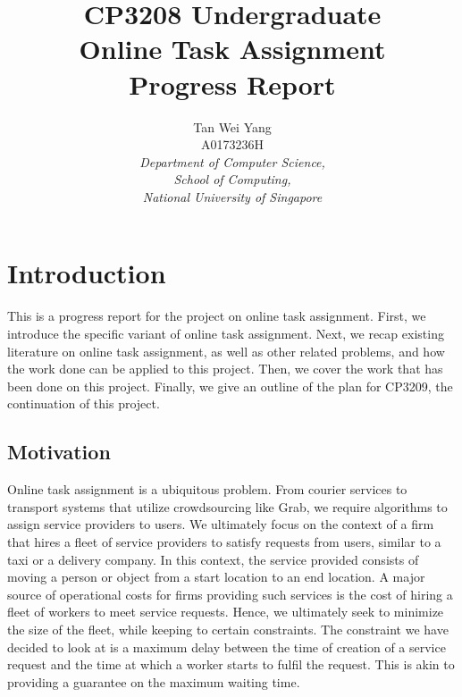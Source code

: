 \documentclass[urop]{nurop}
\begin{document}
\newcommand{\A}{\mathcal{A}}
\newcommand{\R}{\mathcal{R}}
\newcommand{\W}{\mathcal{W}}

\title{CP3208 Undergraduate  \\
	Online Task Assignment\\
	Progress Report}

\author{\large{Tan Wei Yang} \\ A0173236H \\ 
	\normalsize\textit{Department of Computer Science,\\
	School of Computing,\\
	National University of Singapore} 
}
\maketitle


\section{Introduction}
This is a progress report for the project on online task assignment. First, we introduce the specific variant of online task assignment. Next, we recap existing literature on online task assignment, as well as other related problems, and how the work done can be applied to this project. Then, we cover the work that has been done on this project. Finally, we give an outline of the plan for CP3209, the continuation of this project.

\subsection{Motivation}
Online task assignment is a ubiquitous problem. From courier services to transport systems that utilize crowdsourcing like Grab, we require algorithms to assign service providers to users. We ultimately focus on the context of a firm that hires a fleet of service providers to satisfy requests from users, similar to a taxi or a delivery company. In this context, the service provided consists of moving a person or object from a start location to an end location. A major source of operational costs for firms providing such services is the cost of hiring a fleet of workers to meet service requests. Hence, we ultimately seek to minimize the size of the fleet, while keeping to certain constraints. The constraint we have decided to look at is a maximum delay between the time of creation of a service request and the time at which a worker starts to fulfil the request. This is akin to providing a guarantee on the maximum waiting time.
\end{document}
